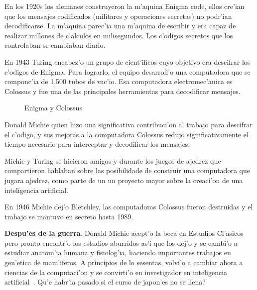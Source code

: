 \documentclass[11pt]{article}
\begin{document}
\medskip
En los 1920s los alemanes construyeron la m'aquina Enigma code, ellos cre'ian que los mensajes codificados (militares y operaciones secretas) no podr'ian decodificarse. La m'aquina parec'ia una m'aquina de escribir y era capaz de realizar millones de c'alculos en milisegundos. Los c'odigos secretos que los controlaban se cambiaban diario.

En 1943 Turing encabez'o un grupo de cient'ificos cuyo objetivo era descifrar los c'odigos de Enigma. Para lograrlo, el equipo desarroll'o una computadora que se componc'ia de 1,500 tubos de vac'io. Esa computadora electromec'anica es Colossus y fue una de las principales herramientas para decodificar mensajes.

\begin{figure}[h]
\begin{center}

\caption{Enigma y Colossus}
  \label{fig:enigmacolossus}
\end{center}
\end{figure} 

Donald Michie quien hizo una significativa contribuci'on al trabajo para descifrar el c'odigo, y sus mejoras a la computadora Colossus redujo significativamente el tiempo necesario para interceptar y decodificar los mensajes. 

Michie y Turing se hicieron amigos y durante los juegos de ajedrez que compartieron hablaban sobre las posibilidade de construir una computadora que jugara ajedrez, como parte de un un proyecto mayor sobre la creaci'on de una inteligencia artificial.

En 1946 Michie dej'o Bletchley, las computadoras Colossus fueron destruidas y el trabajo se mantuvo en secreto hasta 1989.

\medskip
\textbf{Despu'es de la guerra}. Donald Michie acept'o la beca en Estudios Cl'asicos pero pronto encontr'o los estudios aburridos as'i que los dej'o y se cambi'o a estudiar anatom'ia humana y fisiolog'ia, haciendo importantes trabajos en gen'etica de mam'iferos. A principios de lo sesentas, volvi'o a cambiar ahora a ciencias de la computaci'on y se convirti'o en investigador en inteligencia artificial~\cite{colossusJack}. \textquestiondown Qu'e habr'ia pasado si el curso de japon'es no se llena?
\end{document}
